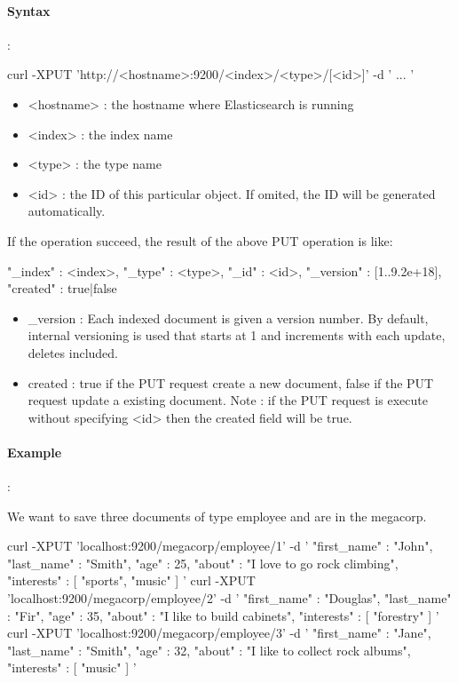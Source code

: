 \documentclass{article}%
\begin{document}
\paragraph{Syntax}:

\begin{command}
curl -XPUT 'http://<hostname>:9200/<index>/<type>/[<id>]' -d '
{
    ...
}'
\end{command}

\begin{itemize}
	\item <hostname> : the hostname where Elasticsearch is running
	\item <index> : the index name
	\item <type> : the type name
	\item <id> : the ID of this particular object. If omited, the ID will be generated automatically.
\end{itemize}

If the operation succeed, the result of the above PUT operation is like:

\begin{command}
{
	"_index" : <index>,
	"_type" : <type>,
	"_id" : <id>,
	"_version" : [1..9.2e+18],
	"created" : true|false
}
\end{command}

\begin{itemize}
	\item \_version : Each indexed document is given a version number. By default, internal versioning is used that starts at 1 and increments with each update, deletes included.
	\item created : true if the PUT request create a new document, false if the PUT request update a existing document. Note : if the PUT request is execute without specifying <id> then the created field will be true.
\end{itemize}

\paragraph{Example}:

We want to save three documents of type employee and are in the megacorp.

\begin{command}
curl -XPUT 'localhost:9200/megacorp/employee/1' -d '
{
	"first_name" : "John",
	"last_name"  : "Smith",
	"age"        : 25,
	"about"      : "I love to go rock climbing",
	"interests"  : [ "sports", "music" ]
}'
curl -XPUT 'localhost:9200/megacorp/employee/2' -d '
{
	"first_name" : "Douglas",
	"last_name"  : "Fir",
	"age"        : 35,
	"about"      : "I like to build cabinets",
	"interests"  : [ "forestry" ]
}'
curl -XPUT 'localhost:9200/megacorp/employee/3' -d '
{
	"first_name" : "Jane",
	"last_name"  : "Smith",
	"age"        : 32,
	"about"      : "I like to collect rock albums",
	"interests"  : [ "music" ]
}'
\end{command}
\end{document}
